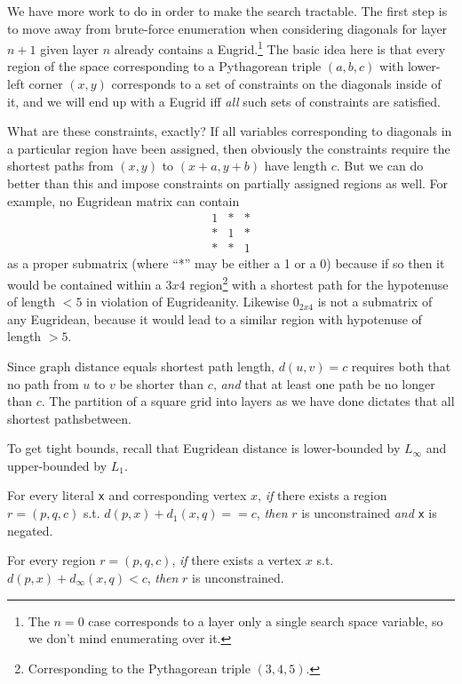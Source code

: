 \documentclass[letterpaper]{article}
\begin{document}
We have more work to do in order to make the search tractable. The first step is to move away
from brute-force enumeration when considering diagonals for layer $n+1$ given layer $n$
already contains a Eugrid.\footnote{The $n=0$ case corresponds to a layer only a single
search space variable, so we don't mind enumerating over it.} The basic idea here is that
every region of the space corresponding to a Pythagorean triple $(a, b, c)$ with lower-left
corner $(x, y)$ corresponds to a set of constraints on the diagonals inside of it, and we
will end up with a Eugrid iff \emph{all} such sets of constraints are satisfied.

What are these constraints, exactly? If all variables corresponding to diagonals in a
particular region have been assigned, then obviously the constraints require the shortest
paths from $(x, y)$ to $(x+a, y+b)$ have length $c$. But we can do better than this and
impose constraints on partially assigned regions as well. For example, no Eugridean matrix
can contain
\begin{equation*}
\begin{matrix}
  1 & * & * \\
  * & 1 & * \\
  * & * & 1
\end{matrix}
\end{equation*}
as a proper submatrix (where ``*'' may be either a 1 or a 0) because if so then it would be
contained within a $3x4$ region\footnote{Corresponding to the Pythagorean triple $(3, 4,
5)$.} with a shortest path for the hypotenuse of length $< 5$ in violation of Eugrideanity.
Likewise $0_{2 x 4}$ is not a submatrix of any Eugridean, because it would lead to a similar
region with hypotenuse of length $> 5$.

Since graph distance equals shortest path length, $d(u, v) = c$ requires both that no path
from $u$ to $v$ be shorter than $c$, \emph{and} that at least one path be no longer than $c$.
The partition of a square grid into layers as we have done dictates that all shortest pathsbetween.

To get tight bounds, recall that Eugridean distance is lower-bounded by $L_\infty$ and
upper-bounded by $L_1$.

For every literal \verb|x| and corresponding vertex $x$, \emph{if} there exists a region
$r = (p, q, c)$ s.t. $d(p, x) + d_1(x, q) == c$, \emph{then} $r$ is unconstrained \emph{and}
\verb|x| is negated.

For every region $r = (p, q, c)$, \emph{if} there exists a vertex $x$ s.t.
$d(p, x) + d_{\infty}(x, q) < c$, \emph{then} $r$ is unconstrained.
\end{document}
